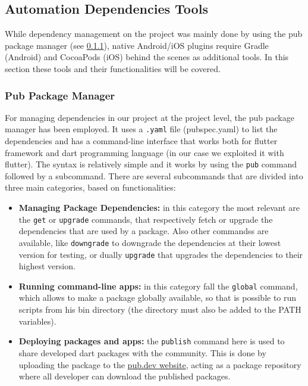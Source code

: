 \newpage
\subsection{Automation Dependencies Tools}
While dependency management on the project was mainly done by using the pub package manager (see \cref{subsubsec:pub}), native Android/iOS plugins require Gradle (Android) and CocoaPods (iOS) behind the scenes as additional tools. In this section these tools and their functionalities will be covered.

\subsubsection{Pub Package Manager}
\label{subsubsec:pub}

For managing dependencies in our project at the project level, the pub package manager has been employed. It uses a \texttt{.yaml} file (pubspec.yaml) to list the dependencies and has a command-line interface that works both for flutter framework and dart programming language (in our case we exploited it with flutter). The syntax is relatively simple and it works by using the \texttt{pub} command followed by a subcommand. \newline There are several subcommands that are divided into three main categories, based on functionalities\cite{Pub}:
\vspace{3ex}
\begin{itemize}[nosep]
    \item \textbf{Managing Package Dependencies:} in this category the most relevant are the \texttt{get} or \texttt{upgrade} commands, that respectively fetch or upgrade the dependencies that are used by a package. Also other commandss are available, like \texttt{downgrade} to downgrade the dependencies at their lowest version for testing, or dually \texttt{upgrade} that upgrades the dependencies to their highest version. 
    \item \textbf{Running command-line apps:} in this category fall the \texttt{global} command, which allows to make a package globally available, so that is possible to run scripts from his bin directory (the directory must also be added to the PATH variables).
    \item \textbf{Deploying packages and apps:} the \texttt{publish} command here is used to share developed dart packages with the community. This is done by uploading the package to the \href{https://pub.dev/}{pub.dev website}, acting as a package repository where all developer can download the published packages. 
\end{itemize}

